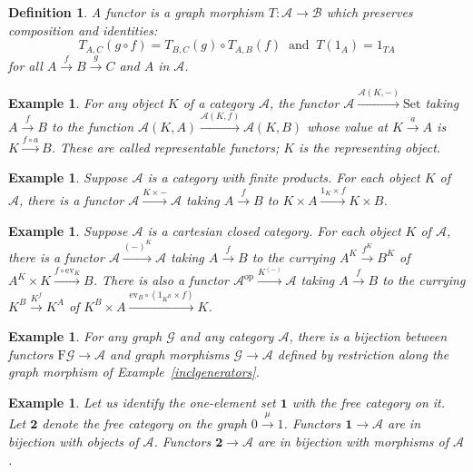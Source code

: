 \documentclass[a4paper,12pt]{article}
\newtheorem{definition}[theorem]{Definition}
\newtheorem{example}[theorem]{Example}
\theoremstyle{step}
\newcommand{\xra}{\xrightarrow}
\def\CA{{\mathscr A}}
\def\CB{{\mathscr B}}
\def\CG{{\mathscr G}}
\begin{document}
\begin{definition} A {\em functor} is a graph morphism $T : \CA\to \CB$ which
preserves composition and identities:
$$ T_{A,C}(g\circ f) = T_{B,C}(g)\circ T_{A,B}(f) \ \text{ and } \ T(1_A) = 1_{TA} $$
for all $A\xra{f}B\xra{g}C$ and $A$ in $\CA$.    
\end{definition}
\begin{example} For any object $K$ of a category $\CA$, the functor $\CA\xra{\CA(K,-)} \mathrm{Set}$ taking $A\xra{f}B$ to the function $\CA(K,A)\xra{\CA(K,f)}\CA(K,B)$ whose value
at $K\xra{a}A$ is $K\xra{f\circ a}B$. These are called {\em representable functors}; $K$ is the
representing object.  
\end{example}
\begin{example} Suppose $\CA$ is a category with finite products. For each object $K$ of
$\CA$, there is a functor $\CA\xra{K\times -} \CA$ taking $A\xra{f}B$ to 
$K\times A\xra{1_K\times f}K\times B$.  
\end{example}
\begin{example} Suppose $\CA$ is a cartesian closed category. For each object $K$ of
$\CA$, there is a functor $\CA\xra{(-)^K} \CA$ taking $A\xra{f}B$ to the currying 
$A^K\xra{f^K} B^K$ of $A^K\times K\xra{f\circ \mathrm{ev}_K}B$. There is also a functor
$\CA^{\mathrm{op}}\xra{K^{(-)}} \CA$ taking $A\xra{f}B$ to the currying $K^B\xra{K^f}K^A$
of $K^B\times A \xra{\mathrm{ev}_B\circ (1_{K^B}\times f)}K$.  
\end{example}
\begin{example} For any graph $\CG$ and any category $\CA$, there is a bijection between functors 
$\mathrm{F}\CG\to \CA$ and graph morphisms $\CG\to \CA$ defined by restriction along the graph
morphism of Example~\ref{inclgenerators}.
\end{example}
\begin{example}\label{objmorfunctors} Let us identify the one-element set $\mathbf{1}$ 
with the free category on it. Let $\mathbf{2}$ denote the free category on the graph $0\xra{\mu}1$. Functors $\mathbf{1}\to \CA$ are in bijection with objects of $\CA$. Functors
$\mathbf{2}\to \CA$ are in bijection with morphisms of $\CA$.     
\end{example}
\end{document}
